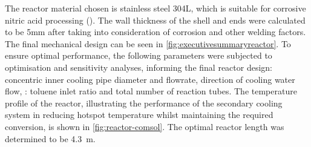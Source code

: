 
The reactor material chosen is stainless steel 304L, which is suitable for corrosive nitric acid processing  (). The wall thickness of the shell and ends were calculated to be 5mm after taking into consideration of corrosion and other welding factors. The final mechanical design can be seen in \cref{fig:executivesummaryreactor}.
To ensure optimal performance, the following parameters were subjected to optimisation and sensitivity analyses, informing the final reactor design: concentric inner cooling pipe diameter and flowrate, direction of cooling water flow,  : toluene inlet ratio and total number of reaction tubes. The temperature profile of the reactor, illustrating the performance of the secondary cooling system in reducing hotspot temperature whilst maintaining the required conversion, is shown in \cref{fig:reactor-comsol}.  %
The optimal reactor length was determined to be \SI{4.3}{\m}. 
